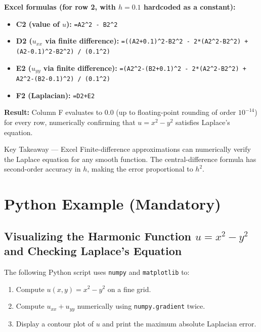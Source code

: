 \documentclass[12pt,a4paper]{article}
\begin{document}
\medskip
\textbf{Excel formulas (for row 2, with $h=0.1$ hardcoded as a constant):}
\begin{itemize}
  \item \textbf{C2 (value of $u$):} \texttt{=A2\^{}2 - B2\^{}2}
  \item \textbf{D2 ($u_{xx}$ via finite difference):}
    \texttt{=((A2+0.1)\^{}2-B2\^{}2 - 2*(A2\^{}2-B2\^{}2) + (A2-0.1)\^{}2-B2\^{}2) / (0.1\^{}2)}
  \item \textbf{E2 ($u_{yy}$ via finite difference):}
    \texttt{=(A2\^{}2-(B2+0.1)\^{}2 - 2*(A2\^{}2-B2\^{}2) + A2\^{}2-(B2-0.1)\^{}2) / (0.1\^{}2)}
  \item \textbf{F2 (Laplacian):} \texttt{=D2+E2}
\end{itemize}

\textbf{Result:} Column F evaluates to $0.0$ (up to floating-point rounding of order $10^{-14}$)
for every row, numerically confirming that $u=x^{2}-y^{2}$ satisfies Laplace's equation.

\begin{learnbox}{Key Takeaway --- Excel}
Finite-difference approximations can numerically verify the Laplace equation for any smooth
function. The central-difference formula has second-order accuracy in $h$, making the error
proportional to $h^{2}$.
\end{learnbox}

\section{Python Example (Mandatory)}

\subsection*{Visualizing the Harmonic Function $u = x^{2}-y^{2}$ and Checking Laplace's Equation}

The following Python script uses \texttt{numpy} and \texttt{matplotlib} to:
\begin{enumerate}
  \item Compute $u(x,y)=x^{2}-y^{2}$ on a fine grid.
  \item Compute $u_{xx}+u_{yy}$ numerically using \texttt{numpy.gradient} twice.
  \item Display a contour plot of $u$ and print the maximum absolute Laplacian error.
\end{enumerate}
\end{document}
